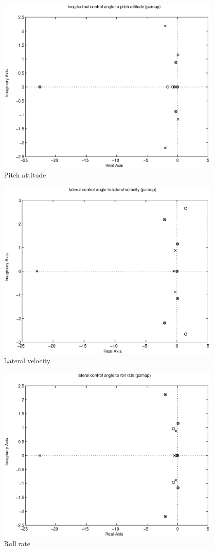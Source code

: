 \documentclass{sydeStyle}
\begin{document}
\begin{figure}[h]
    \centering
    \includegraphics[width=0.8\columnwidth]{figs/14pz}
    \caption{Pitch attitude}
    \label{fig:long4}
\end{figure}

\begin{figure}[h]
    \centering
    \includegraphics[width=0.8\columnwidth]{figs/25pz}
    \caption{Lateral velocity}
    \label{fig:lat1}
\end{figure}

\begin{figure}[h]
    \centering
    \includegraphics[width=0.8\columnwidth]{figs/26pz}
    \caption{Roll rate}
    \label{fig:lat2}
\end{figure}
\end{document}
